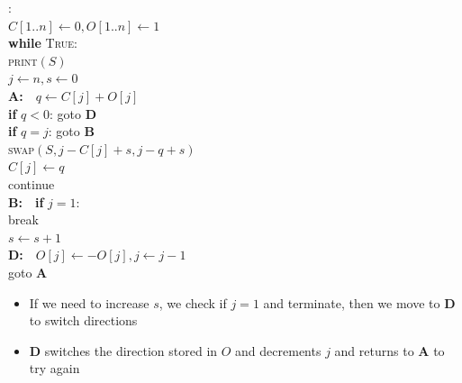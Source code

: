 \documentclass[aspectratio=169]{beamer}
\begin{document}
\begin{frame}{}
\begin{minipage}[c]{0.6\textwidth}
\begin{nalgo}
:
\\\label{}  {\color{lightgray}$C[1..n] \gets 0, O[1..n] \gets 1$}
\\\label{}  {\color{lightgray}\textbf{while} \textsc{True}:\+}
\\\label{}      {\color{lightgray}\textsc{print}$(S)$}
\\\label{}      {\color{lightgray}$j \gets n, s \gets 0$}
\\\label{}      {\color{lightgray}\textbf{A:}~~$q \gets C[j] + O[j]$\+}
\\\label{}          {\color{lightgray}\textbf{if} $q < 0$: goto \textbf{D}}
\\\label{}          {\color{lightgray}\textbf{if} $q = j$: goto \textbf{B}}
\\\label{}          {\color{lightgray}\textsc{swap}$(S, j-C[j]+s, j-q+s)$}
\\\label{}          {\color{lightgray}$C[j] \gets q$} 
\\\label{}          {\color{lightgray}continue\-}
\\\label{}      \textbf{B:}~~\textbf{if} $j=1$:\+\+
\\\label{}              break\-
\\\label{}          $s \gets s+1$\-
\\\label{}    \textbf{D:}~~$O[j] \gets -O[j], j \gets j-1$\+
\\\label{}      goto \textbf{A}
\end{nalgo}
\end{minipage}
\begin{minipage}[c]{0.35\textwidth}
\begin{itemize}
    \item If we need to increase $s$, we check if $j=1$ and terminate, then we move to \textbf{D} to switch directions \pause
    \item \textbf{D} switches the direction stored in $O$ and decrements $j$ and returns to \textbf{A} to try again
\end{itemize}
\end{minipage}
\end{frame}
\end{document}
